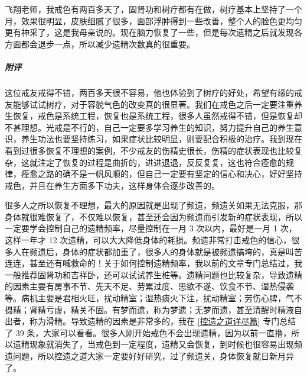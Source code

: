 \begin{case}
    飞翔老师，我戒色有两百多天了，固肾功和树疗都有在做，树疗基本上坚持了一个月，效果很明显，皮肤细腻了很多，面部浮肿得到一些改善，整个人的脸色更均匀更有神采了，这是我母亲说的。现在脑力恢复了一些，但是每次遗精之后就发现各方面都会退步一点，所以减少遗精次数真的很重要。
    \subparagraph{附评} 这位戒友戒得不错，两百多天很不容易，他也体验到了树疗的好处，希望有缘的戒友能够试试树疗，对于容貌气色的改变真的很显著。我们在戒色之后一定要注重养生恢复，戒色是系统工程，恢复也是系统工程，很多人虽然戒得不错，但是恢复却不甚理想。光戒是不行的，自己一定要多学习养生的知识，努力提升自己的养生意识，养生功法也要坚持练习，如果症状比较明显，则要配合积极的治疗。我到现在看到过很多恢复不理想的案例，不少戒友的伤精史很长，伤精的症状表现也比较复杂，这就注定了恢复的过程是曲折的，进进退退，反反复复，这也符合痊愈的规律，痊愈之路的确不是一帆风顺的，但自己一定要有坚定的信心和决心，好好坚持戒色，并且在养生方面多下功夫，这样身体会逐步改善的。

    很多人之所以恢复不理想，最大的原因就是出现了频遗，频遗关如果无法克服，那身体就很难恢复了，不仅难以恢复，甚至还会因为频遗而引发新的症状表现，所以一定要学会控制自己的遗精频率，尽量控制在一月 3 次以内，最好是一月 1 次，这样一年才 12 次遗精，可以大大降低身体的耗损。频遗非常打击戒色的信心，很多人在频遗后，身体的症状都加重了，很多人的身体就是被频遗搞垮的，真是叫苦连连，甚至还有喊救命的！关于如何控制遗精频率，我以前的文章专门总结过，我一般推荐固肾功和吉祥卧，还可以试试养生桩等。遗精问题也比较复杂，导致遗精的因素主要有房事不节、先天不足、劳累过度、思欲不遂、饮食不节、湿热侵袭等。病机主要是君相火旺，扰动精室；湿热痰火下注，扰动精室；劳伤心脾，气不摄精；肾精亏虚，精关不固。有梦而遗，称为梦遗；无梦而遗，甚至清醒时精液自出者，称为滑精。导致遗精的因素是非常多的，我在 \ref{控遗之道详尽篇} 专门总结了 39 条，大家可以看看。很多人刚开始戒色不会出现遗精，因为以前一直撸，所以遗精现象就消失了，当戒色到一定程度，遗精又会恢复，到时候也很容易出现频遗问题，所以控遗之道大家一定要好好研究，过了频遗关，身体恢复就日新月异了。
\end{case}

